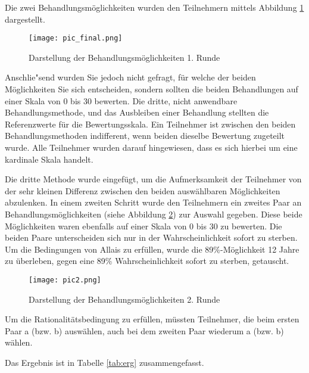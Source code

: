 \documentclass[11pt]{article}
\begin{document}
Die zwei Behandlungsmöglichkeiten wurden den Teilnehmern mittels Abbildung \ref{fig:graph} dargestellt.
\begin{figure}[!h]
  \centering
\texttt{[image: pic\_final.png]}
  \caption{Darstellung der Behandlungsm\"oglichkeiten 1. Runde}\label{fig:graph}
\end{figure}

Anschlie"send wurden Sie jedoch nicht gefragt, für welche der beiden Möglichkeiten Sie sich entscheiden, sondern sollten die beiden Behandlungen auf einer Skala von 0 bis 30 bewerten. Die dritte, nicht anwendbare Behandlungsmethode, und das Ausbleiben einer Behandlung stellten die Referenzwerte für die Bewertungsskala. Ein Teilnehmer ist zwischen den beiden Behandlungsmethoden indifferent, wenn beiden dieselbe Bewertung zugeteilt wurde. Alle Teilnehmer wurden darauf hingewiesen, dass es sich hierbei um eine kardinale Skala handelt.

Die dritte Methode wurde eingefügt, um die Aufmerksamkeit der Teilnehmer von der sehr kleinen Differenz zwischen den beiden auswählbaren Möglichkeiten abzulenken.
In einem zweiten Schritt wurde den Teilnehmern ein zweites Paar an Behandlungsmöglichkeiten (siehe Abbildung \ref{fig:graph2}) zur Auswahl gegeben. Diese beide M\"oglichkeiten  waren ebenfalls auf einer Skala von 0 bis 30 zu bewerten. Die beiden Paare unterscheiden sich nur in der Wahrscheinlichkeit sofort zu sterben. Um die Bedingungen von Allais zu erfüllen, wurde die 89\%-Möglichkeit 12 Jahre zu überleben, gegen eine 89\% Wahrscheinlichkeit sofort zu sterben, getauscht.

\begin{figure}[!h]
  \centering
  \texttt{[image: pic2.png]}
    \caption{Darstellung der Behandlungsm\"oglichkeiten 2. Runde}
  \label{fig:graph2}
\end{figure}

Um die Rationalitätsbedingung zu erfüllen, müssten Teilnehmer, die beim ersten Paar a (bzw. b) auswählen, auch bei dem zweiten Paar wiederum a (bzw. b) wählen.

Das Ergebnis ist in Tabelle \ref{tab:erg} zusammengefasst. 
\end{document}
